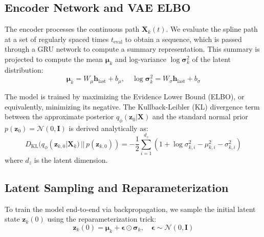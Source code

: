 \documentclass[12pt, a4paper]{report}
\numberwithin{equation}{chapter}
\begin{document}
\subsection{Encoder Network and VAE ELBO}
The encoder processes the continuous path $\mathbf{X}_k(t)$. We evaluate the spline path at a set of regularly spaced times $t_{\text{eval}}$ to obtain a sequence, which is passed through a GRU network to compute a summary representation. This summary is projected to compute the mean $\boldsymbol{\mu}_k$ and log-variance $\log\boldsymbol{\sigma}_k^2$ of the latent distribution:
\begin{equation}
\boldsymbol{\mu}_k = W_{\mu} \mathbf{h}_{\text{last}} + b_{\mu}, \quad \log\boldsymbol{\sigma}_k^2 = W_{\sigma} \mathbf{h}_{\text{last}} + b_{\sigma}
\end{equation}

The model is trained by maximizing the Evidence Lower Bound (ELBO), or equivalently, minimizing its negative. The Kullback-Leibler (KL) divergence term between the approximate posterior $q_\phi(\mathbf{z}_0 | \mathbf{X})$ and the standard normal prior $p(\mathbf{z}_0) = \mathcal{N}(0, \mathbf{I})$ is derived analytically as:
\begin{equation}
D_{\text{KL}}(q_\phi(\mathbf{z}_{k, 0} | \mathbf{X}_k) \,||\, p(\mathbf{z}_{k,0})) = -\frac{1}{2} \sum_{i=1}^{d_z} \left( 1 + \log\sigma_{k, i}^2 - \mu_{k, i}^2 - \sigma_{k, i}^2 \right)
\end{equation}
where $d_z$ is the latent dimension.

\subsection{Latent Sampling and Reparameterization}
To train the model end-to-end via backpropagation, we sample the initial latent state $\mathbf{z}_k(0)$ using the reparameterization trick:
\begin{equation}
\mathbf{z}_k(0) = \boldsymbol{\mu}_k + \boldsymbol{\epsilon} \odot \boldsymbol{\sigma}_k, \quad \boldsymbol{\epsilon} \sim \mathcal{N}(0, \mathbf{I})
\end{equation}
\end{document}

